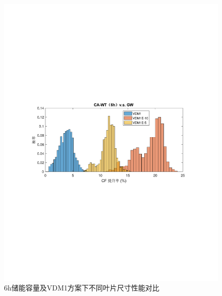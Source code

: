 \begin{figure}[H] %
  \centering
  \includegraphics[scale=0.75]{figures/Chap5-CA-WT-6h-VS-GW-VDM1E.pdf}
  \caption{6h储能容量及VDM1方案下不同叶片尺寸性能对比}
  \label{fig:CA-WT-6h-VS-GW-VDM1E}
\end{figure}

